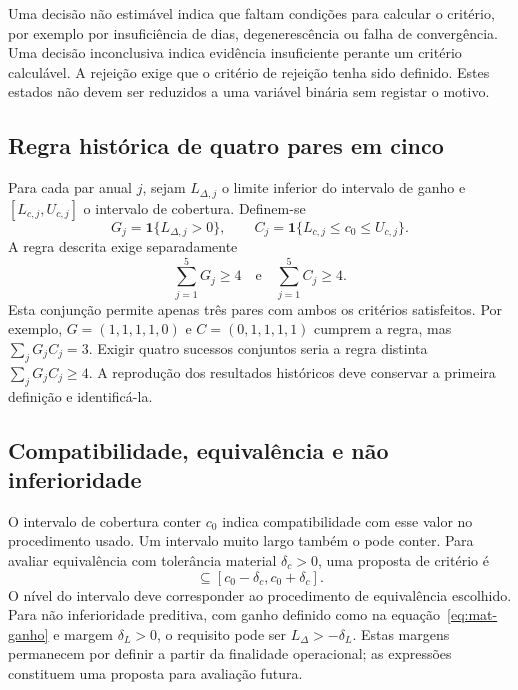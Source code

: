 Uma decisão não estimável indica que faltam condições para calcular o critério, por exemplo por insuficiência de dias, degenerescência ou falha de convergência. Uma decisão inconclusiva indica evidência insuficiente perante um critério calculável. A rejeição exige que o critério de rejeição tenha sido definido. Estes estados não devem ser reduzidos a uma variável binária sem registar o motivo.

\subsection{Regra histórica de quatro pares em cinco}
\label{sec:mat-quatro-cinco}
Para cada par anual $j$, sejam $L_{\Delta,j}$ o limite inferior do intervalo de ganho e $[L_{c,j},U_{c,j}]$ o intervalo de cobertura. Definem-se
\begin{equation}
G_j=\mathbf1\{L_{\Delta,j}>0\},
\qquad C_j=\mathbf1\{L_{c,j}\leq c_0\leq U_{c,j}\}.
\label{eq:mat-indicadores-gate}
\end{equation}
A regra descrita exige separadamente
\begin{equation}
\sum_{j=1}^{5}G_j\geq4
\quad\text{e}\quad
\sum_{j=1}^{5}C_j\geq4.
\label{eq:mat-gate-historico}
\end{equation}
Esta conjunção permite apenas três pares com ambos os critérios satisfeitos. Por exemplo, $G=(1,1,1,1,0)$ e $C=(0,1,1,1,1)$ cumprem a regra, mas $\sum_jG_jC_j=3$. Exigir quatro sucessos conjuntos seria a regra distinta $\sum_jG_jC_j\geq4$. A reprodução dos resultados históricos deve conservar a primeira definição e identificá-la.


\subsection{Compatibilidade, equivalência e não inferioridade}
\label{sec:mat-equivalencia}
O intervalo de cobertura conter $c_0$ indica compatibilidade com esse valor no procedimento usado. Um intervalo muito largo também o pode conter. Para avaliar equivalência com tolerância material $\delta_c>0$, uma proposta de critério é
\begin{equation}
[L_c,U_c]\subseteq[c_0-\delta_c,c_0+\delta_c].
\label{eq:mat-equivalencia}
\end{equation}
O nível do intervalo deve corresponder ao procedimento de equivalência escolhido\parencite{Lakens2017}. Para não inferioridade preditiva, com ganho definido como na equação~\ref{eq:mat-ganho} e margem $\delta_L>0$, o requisito pode ser $L_\Delta>-\delta_L$. Estas margens permanecem por definir a partir da finalidade operacional; as expressões constituem uma proposta para avaliação futura.

